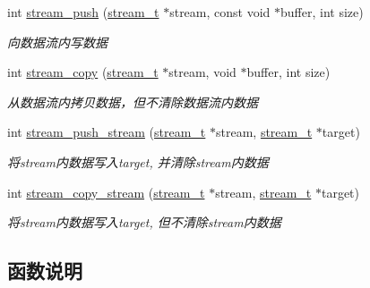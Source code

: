 \begin{DoxyCompactItemize}
int \hyperlink{a00088_gae7e63ef142733eb3aea7401e28bc9a75_gae7e63ef142733eb3aea7401e28bc9a75}{stream\+\_\+push} (\hyperlink{a00044_a261dba04f46f5c59a68a05f69f5a65a8_a261dba04f46f5c59a68a05f69f5a65a8}{stream\+\_\+t} $\ast$stream, const void $\ast$buffer, int size)
\begin{DoxyCompactList}\small\item\em 向数据流内写数据 \end{DoxyCompactList}\item 
int \hyperlink{a00088_ga380555bf71ee99f6b2bb4f76738d507f_ga380555bf71ee99f6b2bb4f76738d507f}{stream\+\_\+copy} (\hyperlink{a00044_a261dba04f46f5c59a68a05f69f5a65a8_a261dba04f46f5c59a68a05f69f5a65a8}{stream\+\_\+t} $\ast$stream, void $\ast$buffer, int size)
\begin{DoxyCompactList}\small\item\em 从数据流内拷贝数据，但不清除数据流内数据 \end{DoxyCompactList}\item 
int \hyperlink{a00088_gad5336c2b89b6edea5f277d5ebc221e15_gad5336c2b89b6edea5f277d5ebc221e15}{stream\+\_\+push\+\_\+stream} (\hyperlink{a00044_a261dba04f46f5c59a68a05f69f5a65a8_a261dba04f46f5c59a68a05f69f5a65a8}{stream\+\_\+t} $\ast$stream, \hyperlink{a00044_a261dba04f46f5c59a68a05f69f5a65a8_a261dba04f46f5c59a68a05f69f5a65a8}{stream\+\_\+t} $\ast$target)
\begin{DoxyCompactList}\small\item\em 将stream内数据写入target, 并清除stream内数据 \end{DoxyCompactList}\item 
int \hyperlink{a00088_ga296aea89ba5bec6566e119855df3b18c_ga296aea89ba5bec6566e119855df3b18c}{stream\+\_\+copy\+\_\+stream} (\hyperlink{a00044_a261dba04f46f5c59a68a05f69f5a65a8_a261dba04f46f5c59a68a05f69f5a65a8}{stream\+\_\+t} $\ast$stream, \hyperlink{a00044_a261dba04f46f5c59a68a05f69f5a65a8_a261dba04f46f5c59a68a05f69f5a65a8}{stream\+\_\+t} $\ast$target)
\begin{DoxyCompactList}\small\item\em 将stream内数据写入target, 但不清除stream内数据 \end{DoxyCompactList}\end{DoxyCompactItemize}


\subsection{函数说明}
\hypertarget{a00088_ga6e109b2dc520782567dc1891af3b945e_ga6e109b2dc520782567dc1891af3b945e}{}
